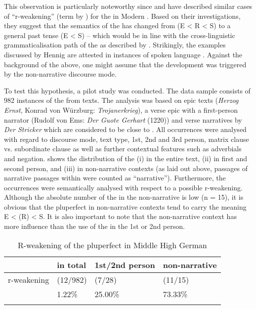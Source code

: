 \documentclass[output=paper,colorlinks,citecolor=brown]{langscibook}
\begin{document}
This observation is particularly noteworthy since \citet{Hennig2000} and \citet{Bertinetto2010} have described similar cases of “r-weakening” (term by \citealt{Bertinetto2010}) for the  in Modern . Based on their investigations, they suggest that the semantics of the  has changed from  (E < R < S) to a general past tense (E < S) – which would be in line with the cross-linguistic grammaticalisation path of the  as described by \citet{Squartini1999}. Strikingly, the examples discussed by Hennig are attested in instances of spoken language \citep[67]{Hennig2000}. Against the background of the above, one might assume that the development was triggered by the non-narrative discourse mode.

To test this hypothesis, a pilot study was conducted. The data sample consists of 982 instances of the  from  texts. The analysis was based on  epic texts (\textit{Herzog Ernst}, Konrad von Würzburg: \textit{Trojanerkrieg}), a verse epic with a first-person narrator (Rudolf von Ems: \textit{Der Guote Gerhart} (1220)) and verse narratives by \textit{Der Stricker} which are considered to be close to . All occurrences were analysed with regard to discourse mode, text type, 1st, 2nd and 3rd person, matrix clause vs. subordinate clause as well as further contextual features such as adverbials and negation.  shows the distribution of the  (i) in the entire text, (ii) in first and second person, and (iii) in non-narrative contexts (as laid out above, passages of narrative passages within  were counted as “narrative”). Furthermore, the occurrences were semantically analysed with respect to a possible r-weakening. Although the absolute number of the  in the non-narrative  is low (n = 15), it is obvious that the pluperfect in non-narrative contexts tend to carry the meaning E < (R) < S. It is also important to note that the non-narrative context has more influence than the use of the  in the 1st or 2nd person. 

\begin{table}
\begin{tabularx}{0.8\textwidth}{lQQQ}
\lsptoprule
& {in total} & {1st/2nd person} & {non-narrative}\\
\midrule
r-weakening & (12/982) & (7/28) & (11/15) \\
& 1.22\% & 25.00\% & 73.33\%\\
\lspbottomrule
\end{tabularx}
\caption{R-weakening of the pluperfect in Middle High German}
\label{tab:zeman:4}
\end{table}
\end{document}
